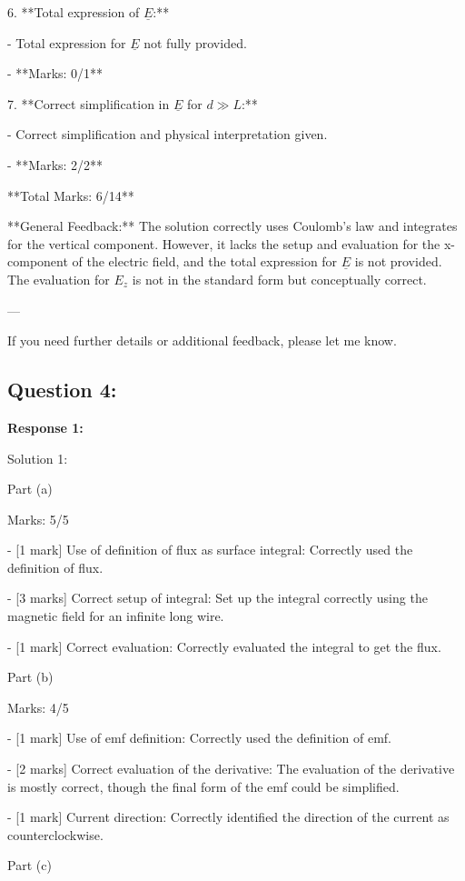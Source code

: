 \documentclass[a4paper,11pt]{article}
\begin{document}
6. **Total expression of \(\underline{E}\):**

   - Total expression for \( \underline{E} \) not fully provided.
   
   - **Marks: 0/1**

7. **Correct simplification in \(\underline{E}\) for \( d \gg L \):**

   - Correct simplification and physical interpretation given.
   
   - **Marks: 2/2**

   **Total Marks: 6/14**

**General Feedback:** The solution correctly uses Coulomb's law and integrates for the vertical component. However, it lacks the setup and evaluation for the x-component of the electric field, and the total expression for \(\underline{E}\) is not provided. The evaluation for \(E_z\) is not in the standard form but conceptually correct.

---

If you need further details or additional feedback, please let me know.


\subsection*{Question 4:}

\textbf{Response 1:}

Solution 1:

Part (a)

Marks: 5/5

- [1 mark] Use of definition of flux as surface integral: Correctly used the definition of flux.

- [3 marks] Correct setup of integral: Set up the integral correctly using the magnetic field for an infinite long wire.

- [1 mark] Correct evaluation: Correctly evaluated the integral to get the flux.

Part (b)

Marks: 4/5

- [1 mark] Use of emf definition: Correctly used the definition of emf.

- [2 marks] Correct evaluation of the derivative: The evaluation of the derivative is mostly correct, though the final form of the emf could be simplified.

- [1 mark] Current direction: Correctly identified the direction of the current as counterclockwise.

Part (c)
\end{document}
